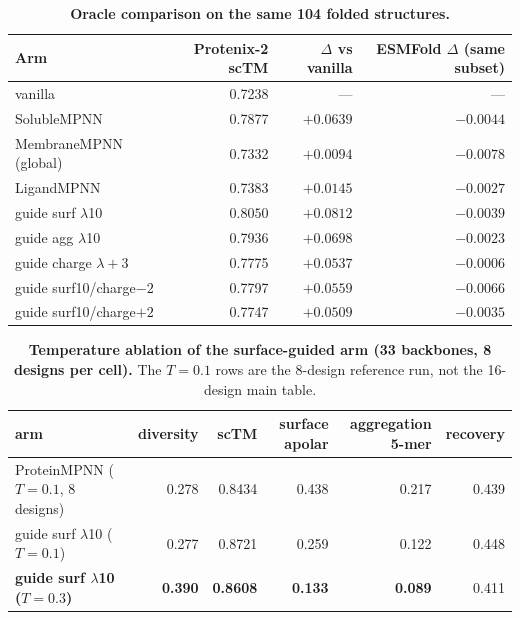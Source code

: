 \begin{table}[H]
  \centering
  \small
  \setlength{\tabcolsep}{5pt}
  \caption{\textbf{Oracle comparison on the same 104 folded structures.}}
  \label{tab:oracle}
  \begin{tabular}{@{}lrrr@{}}
    \toprule
    Arm & Protenix-2 scTM & $\Delta$ vs vanilla & ESMFold $\Delta$ (same subset) \\
    \midrule
    vanilla & 0.7238 & --- & --- \\
    SolubleMPNN & 0.7877 & $+0.0639$ & $-0.0044$ \\
    MembraneMPNN (global) & 0.7332 & $+0.0094$ & $-0.0078$ \\
    LigandMPNN & 0.7383 & $+0.0145$ & $-0.0027$ \\
    guide surf $\lambda$10 & $\bm{0.8050}$ & $\bm{+0.0812}$ & $-0.0039$ \\
    guide agg $\lambda$10 & 0.7936 & $+0.0698$ & $-0.0023$ \\
    guide charge $\lambda{+}3$ & 0.7775 & $+0.0537$ & $-0.0006$ \\
    guide surf10/charge$-2$ & 0.7797 & $+0.0559$ & $-0.0066$ \\
    guide surf10/charge$+2$ & 0.7747 & $+0.0509$ & $-0.0035$ \\
    \bottomrule
  \end{tabular}
\end{table}
\begin{table}[H]
  \centering
  \footnotesize
  \setlength{\tabcolsep}{3pt}
  \caption{\textbf{Temperature ablation of the surface-guided arm (33 backbones,
  8 designs per cell).} The $T{=}0.1$ rows are the 8-design reference run, not
  the 16-design main table.}
  \label{tab:temperature}
  \begin{tabular}{@{}lrrrrr@{}}
    \toprule
    arm & diversity & scTM & surface apolar & aggregation 5-mer & recovery \\
    \midrule
    ProteinMPNN ($T{=}0.1$, 8 designs) & 0.278 & 0.8434 & 0.438 & 0.217 & 0.439 \\
    guide surf $\lambda$10 ($T{=}0.1$) & 0.277 & 0.8721 & 0.259 & 0.122 & 0.448 \\
    \textbf{guide surf $\lambda$10 ($T{=}0.3$)} & \textbf{0.390} & \textbf{0.8608} & \textbf{0.133} & \textbf{0.089} & 0.411 \\
    \bottomrule
  \end{tabular}
\end{table}

